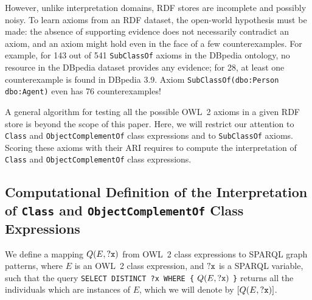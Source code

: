 \documentclass[conference]{IEEEtran}
\begin{document}
However, unlike interpretation domains, RDF stores are incomplete and possibly noisy. 
To learn axioms from an RDF dataset, the open-world hypothesis must be made: the absence of
supporting evidence does not necessarily contradict an axiom, and an axiom might
hold even in the face of a few counterexamples.
For example, for 143 out of 541 \texttt{SubClassOf} axioms in the DBpedia
ontology, no resource in the DBpedia dataset provides any evidence;
for 28, at least one counterexample is found in DBpedia 3.9.
Axiom \texttt{SubClassOf(dbo:Person dbo:Agent)} even has 76 counterexamples!


A general algorithm for testing all the possible OWL~2 axioms in a given RDF store is beyond the scope of this paper. 
Here, we will restrict our attention to \texttt{Class} and \texttt{ObjectComplementOf} class expressions and to \texttt{SubClassOf} axioms. Scoring these axioms with their ARI requires to compute the interpretation of \texttt{Class} and \texttt{ObjectComplementOf} class expressions. 

\subsection{Computational Definition of the Interpretation of \texttt{Class} and \texttt{ObjectComplementOf} Class Expressions}
We define a mapping $Q(E, \mbox{\tt ?x})$ from OWL~2 class expressions to SPARQL graph patterns,
where $E$ is an OWL~2 class expression, and $\mbox{\tt ?x}$ is a SPARQL variable,
such that the query
\texttt{SELECT DISTINCT ?x WHERE \{} $Q(E, \mbox{\tt ?x})$ \texttt{\}}
returns all the individuals which are instances of $E$, which we will denote by
$[Q(E, \mbox{\tt ?x})]$. %
\end{document}
